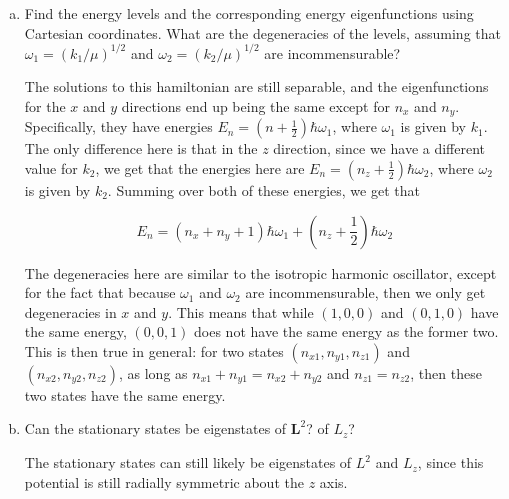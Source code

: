 \documentclass[10pt]{article}
\begin{document}
    \begin{enumerate}[(a)]
        \item Find the energy levels and the corresponding energy eigenfunctions using Cartesian coordinates. What are the degeneracies of the levels, assuming that $\omega_1 = (k_1/\mu)^{1/2}$ and $\omega_2 = (k_2/\mu)^{1/2}$ are incommensurable?
        
        \begin{solution}
            The solutions to this hamiltonian are still separable, and the eigenfunctions for the $x$ and $y$ directions end up being the same except for $n_x$ and $n_y$. Specifically, they have energies $E_n = (n + \frac 12 ) \hbar \omega_1$, where $\omega_1$ is given by $k_1$. The only difference here is that in the $z$ direction, since we have a different value for $k_2$, we get that the energies here are $E_n = (n_z + \frac 12 ) \hbar \omega_2$, where $\omega_2$ is given by $k_2$. Summing over both of these energies, we get that 

            \[ E_n = (n_x + n_y + 1)\hbar \omega_1 + \left(n_z + \frac 12\right)\hbar \omega_2\]

            The degeneracies here are similar to the isotropic harmonic oscillator, except for the fact that because $\omega_1$ and $\omega_2$ are incommensurable, then we only get degeneracies in $x$ and $y$. This means that while $(1, 0, 0)$ and $(0, 1, 0)$ have the same energy, $(0, 0, 1)$ does not have the same energy as the former two. This is then true in general: for two states $(n_{x1}, n_{y1}, n_{z1})$ and $(n_{x2}, n_{y2}, n_{z2})$, as long as $n_{x1} + n_{y1} = n_{x2} + n_{y2}$ and $n_{z1} = n_{z2}$, then these two states have the same energy.
        \end{solution}
        \item Can the stationary states be eigenstates of $\mathbf{L}^2$? of $L_z$?
        
        \begin{solution}
            The stationary states can still likely be eigenstates of $L^2$ and $L_z$, since this potential is still radially symmetric about the $z$ axis. 
        \end{solution}
    \end{enumerate}
\end{document}

